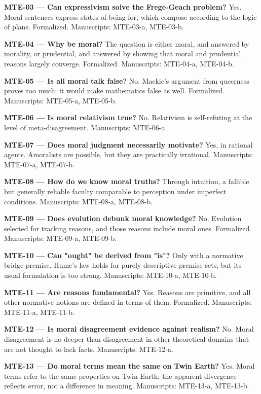 \documentclass[10pt]{article}
\begin{document}
\textbf{MTE-03 --- Can expressivism solve the Frege-Geach problem?} Yes. Moral sentences express states of being for, which compose according to the logic of plans. Formalized. Manuscripts: MTE-03-a, MTE-03-b.

\textbf{MTE-04 --- Why be moral?} The question is either moral, and answered by morality, or prudential, and answered by showing that moral and prudential reasons largely converge. Formalized. Manuscripts: MTE-04-a, MTE-04-b.

\textbf{MTE-05 --- Is all moral talk false?} No. Mackie's argument from queerness proves too much: it would make mathematics false as well. Formalized. Manuscripts: MTE-05-a, MTE-05-b.

\textbf{MTE-06 --- Is moral relativism true?} No. Relativism is self-refuting at the level of meta-disagreement. Manuscripts: MTE-06-a.

\textbf{MTE-07 --- Does moral judgment necessarily motivate?} Yes, in rational agents. Amoralists are possible, but they are practically irrational. Manuscripts: MTE-07-a, MTE-07-b.

\textbf{MTE-08 --- How do we know moral truths?} Through intuition, a fallible but generally reliable faculty comparable to perception under imperfect conditions. Manuscripts: MTE-08-a, MTE-08-b.

\textbf{MTE-09 --- Does evolution debunk moral knowledge?} No. Evolution selected for tracking reasons, and those reasons include moral ones. Formalized. Manuscripts: MTE-09-a, MTE-09-b.

\textbf{MTE-10 --- Can "ought" be derived from "is"?} Only with a normative bridge premise. Hume's law holds for purely descriptive premise sets, but its usual formulation is too strong. Manuscripts: MTE-10-a, MTE-10-b.

\textbf{MTE-11 --- Are reasons fundamental?} Yes. Reasons are primitive, and all other normative notions are defined in terms of them. Formalized. Manuscripts: MTE-11-a, MTE-11-b.

\textbf{MTE-12 --- Is moral disagreement evidence against realism?} No. Moral disagreement is no deeper than disagreement in other theoretical domains that are not thought to lack facts. Manuscripts: MTE-12-a.

\textbf{MTE-13 --- Do moral terms mean the same on Twin Earth?} Yes. Moral terms refer to the same properties on Twin Earth; the apparent divergence reflects error, not a difference in meaning. Manuscripts: MTE-13-a, MTE-13-b.
\end{document}
